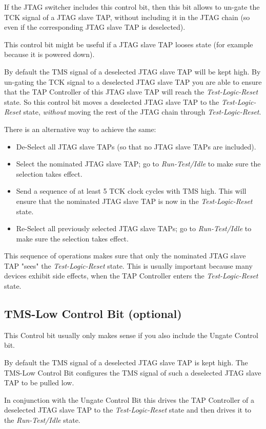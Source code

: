 \documentclass[10pt,english,a4paper]{report}
\begin{document}
If the JTAG switcher includes this control bit, then this bit allows to un-gate
the TCK signal of a JTAG slave TAP, without including it in the JTAG chain (so even if
the corresponding JTAG slave TAP is deselected).

This control bit might be useful if a JTAG slave TAP looses state (for example because it is powered down).

By default the TMS signal of a deselected JTAG slave TAP will be kept high. By un-gating
the TCK signal to a deselected JTAG slave TAP you are able to ensure that the TAP Controller
of this JTAG slave TAP will reach the {\em Test-Logic-Reset} state.
So this control bit moves a deselected JTAG slave TAP to the {\em Test-Logic-Reset} state,
{\em without} moving the rest of the JTAG chain through {\em Test-Logic-Reset}.

There is an alternative way to achieve the same:
\begin{itemize}
\item De-Select all JTAG slave TAPs (so that no JTAG slave TAPs are included).
\item Select the nominated JTAG slave TAP; go to {\em Run-Test/Idle} to make sure the selection takes effect.
\item Send a sequence of at least 5 TCK clock cycles with TMS high. This will ensure that the nominated JTAG slave TAP is now in the {\em Test-Logic-Reset} state.
\item Re-Select all previously selected JTAG slave TAPs; go to {\em Run-Test/Idle} to make sure the selection takes effect.
\end{itemize}
This sequence of operations makes sure that only the nominated JTAG slave TAP "sees" the {\em Test-Logic-Reset} state. This is usually
important because many devices exhibit side effects, when the TAP Controller enters the {\em Test-Logic-Reset} state.

\newpage
\subsection{TMS-Low Control Bit (optional)}
This Control bit usually only makes sense if you also include the Ungate Control bit.

By default the TMS signal of a deselected JTAG slave TAP is kept high.
The TMS-Low Control Bit configures the TMS signal of such a deselected JTAG slave TAP to be pulled low.

In conjunction with the Ungate Control Bit this drives the TAP Controller of a deselected JTAG slave TAP
to the {\em Test-Logic-Reset} state and then drives it to the {\em Run-Test/Idle} state.
\end{document}
